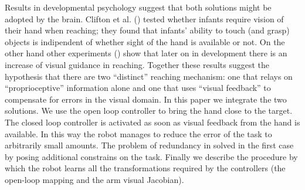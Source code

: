 Results in developmental psychology suggest that both solutions might be
adopted by the brain. Clifton et al. (\cite{clifton93isvisually}) 
tested whether infants require vision of their hand when reaching; they 
found that infants' ability to touch (and grasp) objects is indipendent 
of whether sight of the hand is available or not. On the other hand 
other experiments (\cite{ashmead93visual}) 
show that later on in development there is an increase of visual guidance 
in reaching. Together these results suggest the hypothesis that there 
are two ``distinct'' reaching mechanism: one that relays on ``proprioceptive'' 
information alone and one that uses ``visual feedback'' to compensate 
for errors in the visual domain.
In this paper we integrate the two solutions. We use the open loop
controller to bring the hand close to the target. The closed loop controller 
is activated as soon as visual feedback from the hand is available. In this
way the robot manages to reduce the error of the task to arbitrarily small 
amounts. The problem of redundancy in solved in the first case by posing 
additional constrains on the task. Finally we describe the procedure by 
which the robot learns all the transformations required by the controllers 
(the open-loop mapping and the arm visual Jacobian).